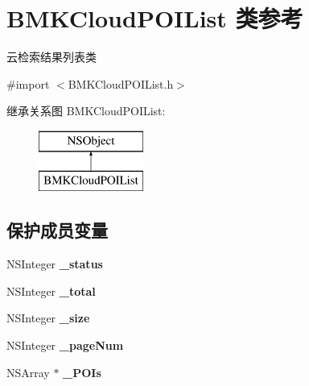 \hypertarget{interface_b_m_k_cloud_p_o_i_list}{\section{B\-M\-K\-Cloud\-P\-O\-I\-List 类参考}
\label{interface_b_m_k_cloud_p_o_i_list}
}


云检索结果列表类  




{\ttfamily \#import $<$B\-M\-K\-Cloud\-P\-O\-I\-List.\-h$>$}

继承关系图 B\-M\-K\-Cloud\-P\-O\-I\-List\-:\begin{figure}[H]
\begin{center}
\leavevmode
\includegraphics[height=2.000000cm]{interface_b_m_k_cloud_p_o_i_list}
\end{center}
\end{figure}
\subsection*{保护成员变量}
\begin{DoxyCompactItemize}
\item 
\hypertarget{interface_b_m_k_cloud_p_o_i_list_aeb5ee15bcbcfeaceb50cc735bcd5ca88}{N\-S\-Integer {\bfseries \-\_\-status}}\label{interface_b_m_k_cloud_p_o_i_list_aeb5ee15bcbcfeaceb50cc735bcd5ca88}

\item 
\hypertarget{interface_b_m_k_cloud_p_o_i_list_a0dead6846580429a7bca29d4c6336b90}{N\-S\-Integer {\bfseries \-\_\-total}}\label{interface_b_m_k_cloud_p_o_i_list_a0dead6846580429a7bca29d4c6336b90}

\item 
\hypertarget{interface_b_m_k_cloud_p_o_i_list_a43b86ee89f20f0bf99d10140fbc485ca}{N\-S\-Integer {\bfseries \-\_\-size}}\label{interface_b_m_k_cloud_p_o_i_list_a43b86ee89f20f0bf99d10140fbc485ca}

\item 
\hypertarget{interface_b_m_k_cloud_p_o_i_list_a1889b7fae8eef754ecac35daf15e65c6}{N\-S\-Integer {\bfseries \-\_\-page\-Num}}\label{interface_b_m_k_cloud_p_o_i_list_a1889b7fae8eef754ecac35daf15e65c6}

\item 
\hypertarget{interface_b_m_k_cloud_p_o_i_list_a513d425912e3517a7ae9286d8ef39d49}{N\-S\-Array $\ast$ {\bfseries \-\_\-\-P\-O\-Is}}\label{interface_b_m_k_cloud_p_o_i_list_a513d425912e3517a7ae9286d8ef39d49}

\end{DoxyCompactItemize}
